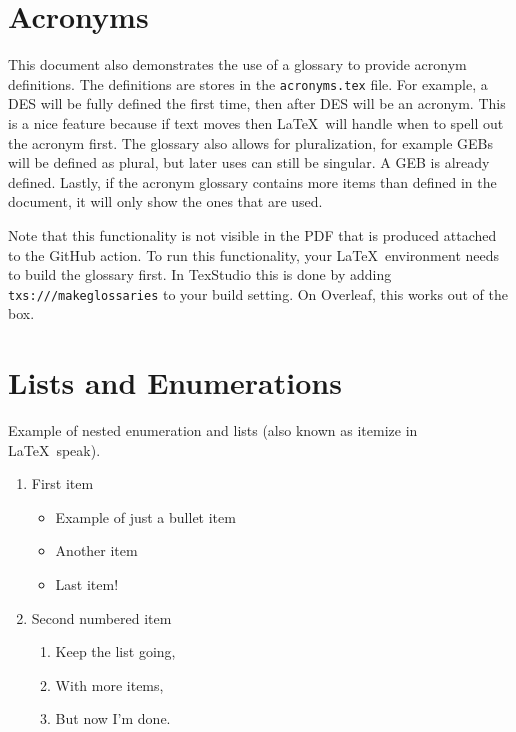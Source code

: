\section{Acronyms}

This document also demonstrates the use of a glossary to provide acronym definitions. The definitions are stores in the \texttt{acronyms.tex} file. For example, a \gls{DES} will be fully defined the first time, then after \gls{DES} will be an acronym. This is a nice feature because if text moves then \LaTeX\ will handle when to spell out the acronym first. The glossary also allows for pluralization, for example \glspl{GEB} will be defined as plural, but later uses can still be singular. A \gls{GEB} is already defined. Lastly, if the acronym glossary contains more items than defined in the document, it will only show the ones that are used.

Note that this functionality is not visible in the PDF that is produced attached to the GitHub action. To run this functionality, your \LaTeX\ environment needs to build the glossary first. In TexStudio this is done by adding \texttt{txs:///makeglossaries} to your build setting. On Overleaf, this works out of the box.

\section{Lists and Enumerations}

Example of nested enumeration and lists (also known as itemize in \LaTeX\ speak).

\begin{enumerate}
	\item First item
	      \begin{itemize}
		      \item Example of just a bullet item
		      \item Another item
		      \item Last item!
	      \end{itemize}

	\item Second numbered item
	      \begin{enumerate}
		      \item Keep the list going,
		      \item With more items,
		      \item But now I'm done.
	      \end{enumerate}
\end{enumerate}

